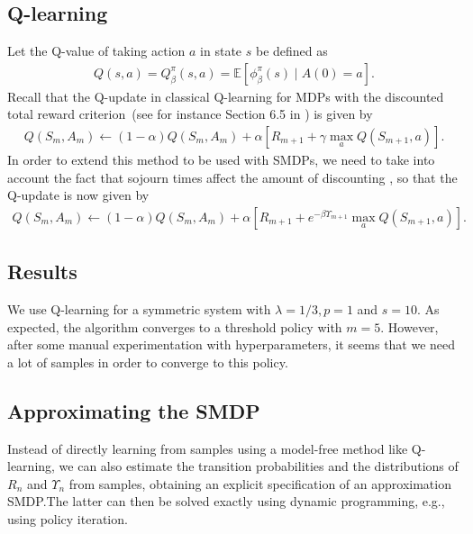 \documentclass{article}
\theoremstyle{definition}
\theoremstyle{plain}
\begin{document}
\subsection{Q-learning}

Let the Q-value of taking action $a$ in state $s$ be defined as
\begin{align}
  Q(s, a) = Q_{\beta}^{\pi}(s, a) = \mathbb{E} \left[ \phi_{\beta}^{\pi}(s) \; \big| \;  A(0) = a \right] .
\end{align}
%
Recall that the Q-update in classical Q-learning for MDPs with the discounted
total reward criterion~(see for instance Section 6.5 in \cite{suttonReinforcementLearningIntroduction2018}) is given by
\begin{align}
  Q(S_{m}, A_{m}) \leftarrow (1 - \alpha) Q(S_{m}, A_{m}) + \alpha[ R_{m+1} + \gamma \max_{a} Q(S_{m+1}, a) ] .
\end{align}
%
In order to extend this method to be used with SMDPs, we need to take into
account the fact that sojourn times affect the amount of discounting
\citep{gosaviSimulationBasedOptimizationParametric2015}, so that the Q-update is
now given by
\begin{align}
  Q(S_{m}, A_{m}) \leftarrow (1 - \alpha) Q(S_{m}, A_{m}) + \alpha[ R_{m+1} + e^{- \beta \Upsilon_{m+1}} \max_{a} Q(S_{m+1}, a) ] .
\end{align}


\subsection{Results}

We use Q-learning for a symmetric system with $\lambda = 1/3, p = 1$ and
$s = 10$. As expected, the algorithm converges to a threshold policy with $m=5$.
However, after some manual experimentation with hyperparameters, it seems that
we need a lot of samples in order to converge to this policy.

\subsection{Approximating the SMDP}

Instead of directly learning from samples using a model-free method like
Q-learning, we can also estimate the transition probabilities and the
distributions of $R_{n}$ and $\Upsilon_{n}$ from samples, obtaining an explicit
specification of an approximation SMDP.\@ The latter can then be solved exactly
using dynamic programming, e.g., using policy iteration.
\end{document}
